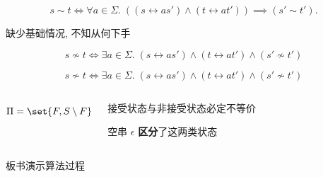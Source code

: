 \begin{frame}{}
  \begin{center}
    \[
      s \sim t \iff \forall a \in \Sigma.\; 
        \left((s \rel{a} s') \land (t \rel{a} t')\right) \implies (s' \sim t').
    \]

    缺少基础情况, 不知从何下手

    \pause
    \[
      s \nsim t \iff \exists a \in \Sigma.\;
        (s \rel{a} s') \land (t \rel{a} t') \land (s' \nsim t')
    \]

    \pause
  \end{center}

\end{frame}

\begin{frame}{}
  \begin{center}
    \[
      s \nsim t \iff \exists a \in \Sigma.\;
        (s \rel{a} s') \land (t \rel{a} t') \land (s' \nsim t')
    \]

    \pause
    \vspace{0.30cm}
  \end{center}

  \pause
  \begin{columns}
      \[
        \Pi = \set{F, S \setminus F}
      \]

      \vspace{0.30cm}
      \begin{center}
        接受状态与非接受状态必定不等价

        \pause
        \vspace{0.50cm}
        空串 $\epsilon$ {\bf 区分}了这两类状态
      \end{center}
  \end{columns}
\end{frame}

\begin{frame}{}
  \begin{center}

    \vspace{0.30cm}
    板书演示算法过程
  \end{center}
\end{frame}

